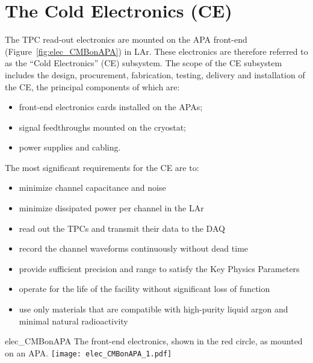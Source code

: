 \section{The Cold Electronics (CE)} 
\label{sec:detectors-fd-ref-ce}

The TPC read-out electronics are mounted on the APA front-end (Figure~\ref{fig:elec_CMBonAPA}) in LAr.
These electronics are therefore referred to as the ``Cold Electronics'' (CE) subsystem. 
The scope of the CE subsystem includes the design, procurement, fabrication, testing,
delivery and installation of the CE, the principal components of which are:
\begin{itemize}
\item front-end electronics cards installed on the APAs;
\item signal feedthroughs mounted on the cryostat;
\item power supplies and cabling.
\end{itemize}
The most significant requirements for the CE are to:
\begin{itemize}	
\item minimize channel capacitance and noise
\item minimize dissipated power per channel in the LAr
\item read out the TPCs and transmit their data to the DAQ
\item record the channel waveforms continuously without dead time
\item provide sufficient precision and range to satisfy the Key Physics Parameters
\item operate for the life of the facility without significant loss of function
\item use only materials that are compatible with high-purity liquid argon and minimal natural radioactivity
\end{itemize}
\begin{cdrfigure}{elec_CMBonAPA}
 {The front-end electronics, shown in the red circle, as mounted on an APA.}
\texttt{[image: elec\_CMBonAPA\_1.pdf]}
\end{cdrfigure}

